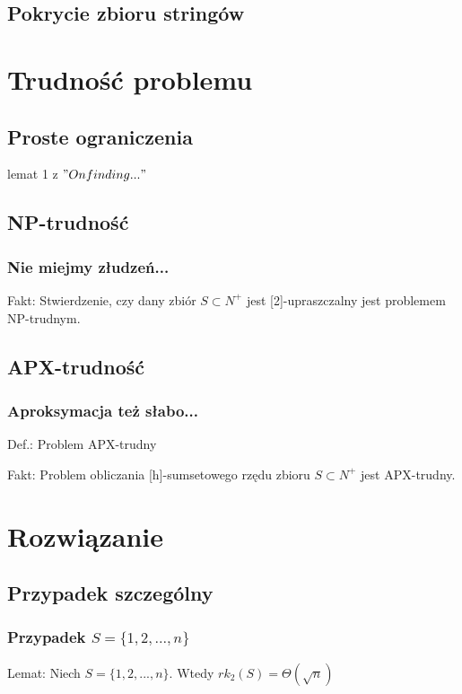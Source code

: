 \documentclass{beamer}
\begin{document}
	\subsection{Pokrycie zbioru stringów}
		\begin{frame}
		\end{frame}
		
\section{Trudność problemu}
	\subsection{Proste ograniczenia}
		\begin{frame}
			lemat 1 z $"On finding..."$
		\end{frame}
		
	\subsection{NP-trudność}
		\begin{frame} \frametitle{Nie miejmy złudzeń...}
			Fakt: Stwierdzenie, czy dany zbiór $ S \subset N^{+} $ jest [2]-upraszczalny jest problemem NP-trudnym.
		\end{frame}
		
	\subsection{APX-trudność}
		\begin{frame} \frametitle{Aproksymacja też słabo...}
			Def.: Problem APX-trudny
		
			Fakt: Problem obliczania [h]-sumsetowego rzędu zbioru $ S \subset N^{+} $ jest APX-trudny.
		\end{frame}
		
\section{Rozwiązanie}
	\subsection{Przypadek szczególny}
		\begin{frame} \frametitle{Przypadek $ S = \lbrace 1,2,...,n \rbrace $}
			Lemat: Niech $ S = \lbrace 1,2,...,n \rbrace $. Wtedy $ rk_{2}(S) = \Theta(\sqrt{n}) $
		\end{frame}
		
\end{document}
